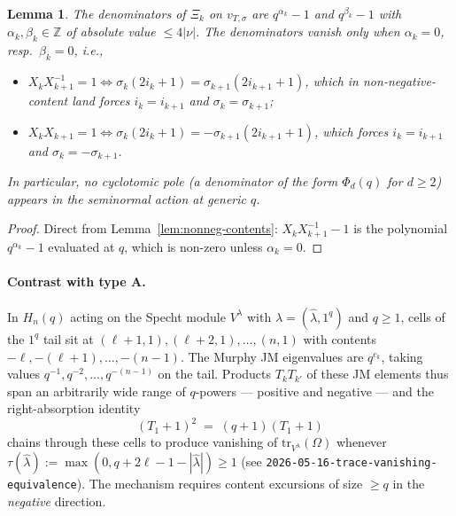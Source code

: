 \documentclass[11pt]{article}
\newtheorem{lemma}{Lemma}
\newcommand{\HE}{H_n(q)}
\newcommand{\Om}{\Omega}
\newcommand{\Xih}{\Xi}
\newcommand{\tr}{\mathrm{tr}}
\begin{document}
\begin{lemma}
\label{lem:no-poles}
The denominators of $\Xih_k$ on $v_{T,\sigma}$ are
$q^{\alpha_k} - 1$ and $q^{\beta_k} - 1$ with
$\alpha_k, \beta_k \in \mathbb{Z}$ of absolute value $\le 4|\nu|$.
The denominators vanish only when $\alpha_k = 0$, resp.\ $\beta_k = 0$,
i.e.,
\begin{itemize}
\item $X_k X_{k+1}^{-1} = 1 \iff
\sigma_k(2 i_k + 1) = \sigma_{k+1}(2 i_{k+1} + 1)$,
which in non-negative-content land forces
$i_k = i_{k+1}$ and $\sigma_k = \sigma_{k+1}$;
\item $X_k X_{k+1} = 1 \iff
\sigma_k(2 i_k + 1) = -\sigma_{k+1}(2 i_{k+1} + 1)$,
which forces $i_k = i_{k+1}$ and $\sigma_k = -\sigma_{k+1}$.
\end{itemize}
In particular, no \emph{cyclotomic} pole (a denominator of the form
$\Phi_d(q)$ for $d \ge 2$) appears in the seminormal action at generic $q$.
\end{lemma}

\begin{proof}
Direct from Lemma~\ref{lem:nonneg-contents}: $X_k X_{k+1}^{-1} - 1$ is the
polynomial $q^{\alpha_k} - 1$ evaluated at $q$, which is non-zero unless
$\alpha_k = 0$.
\end{proof}

\paragraph{Contrast with type A.}
In $\HE$ acting on the Specht module $V^{\lambda}$ with
$\lambda = (\hat\lambda, 1^{q})$ and $q \ge 1$, cells of the $1^{q}$ tail sit
at $(\ell + 1, 1), (\ell + 2, 1), \dots, (n, 1)$ with contents
$-\ell, -(\ell+1), \dots, -(n-1)$. The Murphy JM eigenvalues are
$q^{c_k}$, taking values $q^{-1}, q^{-2}, \ldots, q^{-(n-1)}$ on the tail.
Products $T_k T_{k'}$ of these JM elements thus span an arbitrarily wide
range of $q$-powers --- positive and negative --- and the right-absorption
identity
\[
(T_1 + 1)^{2} \;=\; (q+1)(T_1 + 1)
\]
chains through these cells to produce vanishing of $\tr_{V^{\lambda}}(\Om)$
whenever $\tau(\hat\lambda) := \max(0, q + 2\ell - 1 - |\hat\lambda|) \ge 1$
(see \texttt{2026-05-16-trace-vanishing-equivalence}).
The mechanism requires content excursions of size $\ge q$ in the
\emph{negative} direction.
\end{document}
